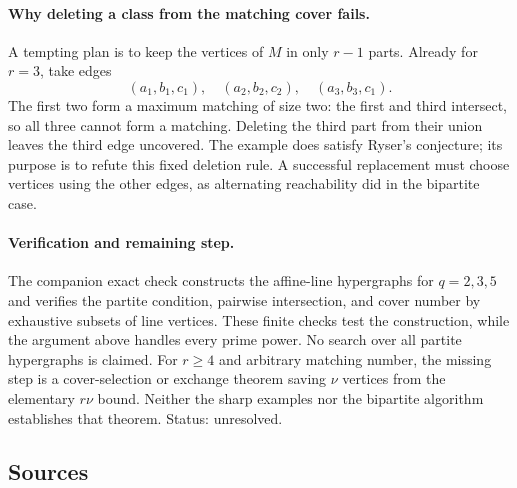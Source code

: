 \documentclass[11pt,a4paper]{article}
\begin{document}
\paragraph{Why deleting a class from the matching cover fails.}
A tempting plan is to keep the vertices of $M$ in only $r-1$ parts.
Already for $r=3$, take edges
\[
 (a_1,b_1,c_1),\quad(a_2,b_2,c_2),\quad(a_3,b_3,c_1).
\]
The first two form a maximum matching of size two: the first and third
intersect, so all three cannot form a matching. Deleting the third
part from their union leaves the third edge uncovered. The example
does satisfy Ryser's conjecture; its purpose is to refute this fixed
deletion rule. A successful replacement must choose vertices using
the other edges, as alternating reachability did in the bipartite case.

\paragraph{Verification and remaining step.}
The companion exact check constructs the affine-line hypergraphs for
$q=2,3,5$ and verifies the partite condition, pairwise intersection,
and cover number by exhaustive subsets of line vertices. These finite
checks test the construction, while the argument above handles every
prime power. No search over all partite hypergraphs is claimed.
For $r\geq4$ and arbitrary matching number, the missing step is a
cover-selection or exchange theorem saving $\nu$ vertices from the
elementary $r\nu$ bound. Neither the sharp examples nor the bipartite
algorithm establishes that theorem. Status: unresolved.

\subsection{Sources}
\end{document}
